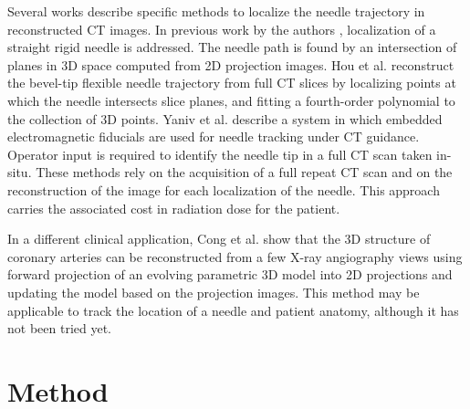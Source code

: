 Several works describe specific methods to localize the needle trajectory in reconstructed CT images. 
In previous work by the authors \cite{medan2017reduced}, localization of a straight rigid needle is addressed. The needle path is found by an intersection of planes in 3D space computed from 2D projection images. 
Hou et al. \cite{huo2015shape} reconstruct the bevel-tip flexible needle trajectory from full CT slices by localizing points at which the needle intersects slice planes, and fitting a fourth-order polynomial to the collection of 3D points.
Yaniv et al. \cite{yaniv2010needle} describe a system in which embedded electromagnetic fiducials are used for needle tracking under CT guidance. Operator input is required to identify the needle tip in a full CT scan taken in-situ. These methods rely on the acquisition of a full repeat CT scan and on the reconstruction of the image for each localization of the needle. This approach carries the associated cost in radiation dose for the patient. 

In a different clinical application, Cong et al.  \cite{cong2015quantitative} show that the 3D structure of coronary arteries can be reconstructed from a few X-ray angiography views using forward projection of an evolving parametric 3D model into 2D projections and updating the model based on the projection images. This method may be applicable to track the location of a needle and patient anatomy, although it has not been tried yet. 

\section*{Method}

